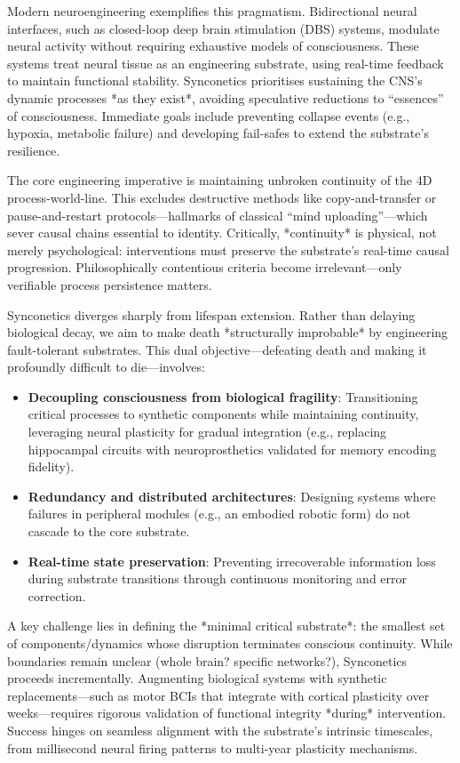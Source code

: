 \documentclass[10pt]{article}
\begin{document}
\begin{sloppypar}
  Modern neuroengineering exemplifies this pragmatism. Bidirectional neural interfaces, such as closed-loop deep brain stimulation (DBS) systems, modulate neural activity without requiring exhaustive models of consciousness. These systems treat neural tissue as an engineering substrate, using real-time feedback to maintain functional stability. Synconetics prioritises sustaining the CNS’s dynamic processes *as they exist*, avoiding speculative reductions to “essences” of consciousness. Immediate goals include preventing collapse events (e.g., hypoxia, metabolic failure) and developing fail-safes to extend the substrate’s resilience.

  The core engineering imperative is maintaining unbroken continuity of the 4D process-world-line. This excludes destructive methods like copy-and-transfer or pause-and-restart protocols—hallmarks of classical “mind uploading”—which sever causal chains essential to identity. Critically, *continuity* is physical, not merely psychological: interventions must preserve the substrate’s real-time causal progression. Philosophically contentious criteria become irrelevant—only verifiable process persistence matters.

  Synconetics diverges sharply from lifespan extension. Rather than delaying biological decay, we aim to make death *structurally improbable* by engineering fault-tolerant substrates. This dual objective—defeating death and making it profoundly difficult to die—involves:

  \begin{itemize}
    \item \textbf{Decoupling consciousness from biological fragility}: Transitioning critical processes to synthetic components while maintaining continuity, leveraging neural plasticity for gradual integration (e.g., replacing hippocampal circuits with neuroprosthetics validated for memory encoding fidelity).
    \item \textbf{Redundancy and distributed architectures}: Designing systems where failures in peripheral modules (e.g., an embodied robotic form) do not cascade to the core substrate.
    \item \textbf{Real-time state preservation}: Preventing irrecoverable information loss during substrate transitions through continuous monitoring and error correction.
  \end{itemize}

  A key challenge lies in defining the *minimal critical substrate*: the smallest set of components/dynamics whose disruption terminates conscious continuity. While boundaries remain unclear (whole brain? specific networks?), Synconetics proceeds incrementally. Augmenting biological systems with synthetic replacements—such as motor BCIs that integrate with cortical plasticity over weeks—requires rigorous validation of functional integrity *during* intervention. Success hinges on seamless alignment with the substrate’s intrinsic timescales, from millisecond neural firing patterns to multi-year plasticity mechanisms.


\end{sloppypar}
\end{document}
